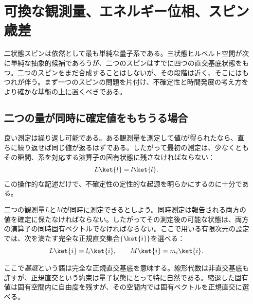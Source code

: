 \chapter{可換な観測量、エネルギー位相、スピン歳差}


二状態スピンは依然として最も単純な量子系である。三状態ヒルベルト空間が次に単純な抽象的候補であろうが、二つのスピンはすでに四つの直交基底状態をもつ。二つのスピンをまだ合成することはしないが、その段階は近く、そこにはもつれが伴う。まず一つのスピンの問題を片付け、不確定性と時間発展の考え方をより確かな基盤の上に置くべきである。

\section{二つの量が同時に確定値をもちうる場合}

良い測定は繰り返し可能である。ある観測量を測定して値\(l\)が得られたなら、直ちに繰り返せば同じ値が返るはずである。したがって最初の測定は、少なくともその瞬間、系を対応する演算子の固有状態に残さなければならない：
\begin{equation}
L\ket{l}=l\ket{l}.
\end{equation}
この操作的な記述だけで、不確定性の定性的な起源を明らかにするのに十分である。

二つの観測量\(L\)と\(M\)が同時に測定できるとしよう。同時測定は報告される両方の値を確定に保たなければならない。したがってその測定後の可能な状態は、両方の演算子の同時固有ベクトルでなければならない。ここで用いる有限次元の設定では、次を満たす完全な正規直交集合\(\{\ket{i}\}\)を選べる：
\begin{equation}
L\ket{i}=l_i\ket{i},
\qquad
M\ket{i}=m_i\ket{i}.
\label{eq:l5-common-eigenvectors}
\end{equation}

\begin{remark}ここで\emph{基底}という語は完全な正規直交基底を意味する。線形代数は非直交基底も許すが、正規直交という約束は量子状態にとって特に自然である。縮退した固有値は固有空間内に自由度を残すが、その空間内では固有ベクトルを正規直交に選べる。
\end{remark}

